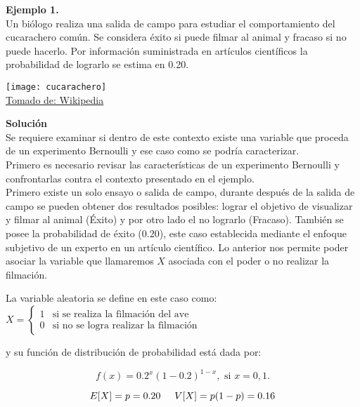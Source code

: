 \documentclass[base=hide,12pt]{elegantbook}
\begin{document}
\vspace{.5cm} 
\textcolor{col3}{\bf \large Ejemplo 1.}\\  
Un biólogo realiza una salida de campo para estudiar el comportamiento del cucarachero común. Se considera éxito si puede filmar al animal y fracaso si no puede hacerlo. Por información suministrada en artículos científicos la probabilidad de lograrlo se estima en 0.20. \\
\begin{center}
	\texttt{[image: cucarachero]}\\
	\href{https://es.wikipedia.org/wiki/Cistothorus_apolinari}{Tomado de: Wikipedia}
\end{center}

\textcolor{col3}{\bf \large Solución }\\
Se requiere examinar si dentro de este contexto existe una variable que proceda de un experimento Bernoulli y ese caso como se podría caracterizar.\\

 Primero es necesario revisar las características de un experimento Bernoulli y confrontarlas contra el contexto presentado en el ejemplo. \\

Primero existe un solo ensayo o salida de campo, durante después de la salida de campo se pueden obtener dos resultados posibles: lograr el objetivo de visualizar y filmar al animal (Éxito) y por otro lado el no lograrlo (Fracaso). También se posee la probabilidad de éxito ($0.20$), este caso establecida mediante el enfoque subjetivo de un experto en un artículo científico. Lo anterior nos permite poder asociar la variable que llamaremos $X$ asociada con el poder o no realizar la filmación.

La variable aleatoria se define en este caso como:\\

$
X =\left\lbrace
\begin{array}{lll}
	1 & \mbox{si se realiza la filmación del ave}   \\
	0 & \mbox{si no se logra realizar la filmación}
\end{array}
\right.
$

y su función de distribución de probabilidad está dada por:

$$f(x)= 0.2^{x} (1-0.2)^{1-x} ,\text{ si } x=0,1.$$

$$ E[X]=p =0.20 \hspace{.5cm} V[X] =p(1-p)= 0.16$$
\\
\vspace{.5cm}
\end{document}
